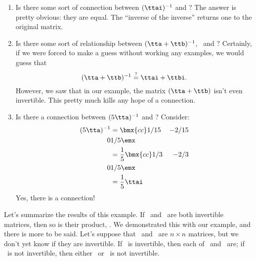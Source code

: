 {\begin{enumerate}
\item		Is there some sort of connection between $(\ttai)^{-1}$ and \tta? The answer is pretty obvious: they are equal. The ``inverse of the inverse'' returns one to the original matrix.


\item		Is there some sort of relationship between $(\tta+\ttb)^{-1}$, \ttai\ and \ttbi? Certainly, if we were forced to make a guess without working any examples, we would guess that 
\[
(\tta+\ttb)^{-1} \overset{\text{?}}{=} \ttai+\ttbi.
\]
However, we saw that in our example, the matrix $(\tta+\ttb)$ isn't even invertible. This pretty much kills any hope of a connection.

\item		Is there a connection between $(5\tta)^{-1}$ and \ttai? Consider:
	\begin{align*} 
   (5\tta)^{-1} &= \bmx{cc} 1/15 & -2/15\\ 0 & 1/5\emx \\
				&= \frac{1}{5} \bmx{cc} 1/3 & -2/3\\0&1/5\emx \\
				&= \frac 15 \ttai
	\end{align*}
\enlargethispage{2\baselineskip}	
	Yes, there is a connection!
\end{enumerate}
} 

\pagebreak

Let's summarize the results of this example. If \tta\ and \ttb\ are both invertible matrices, then so is their product, \tta\ttb. We demonstrated this with our example, and there is more to be said. Let's suppose that \tta\ and \ttb\ are $n\times n$ matrices, but we don't yet know if they are invertible. If \tta\ttb\ is invertible, then each of \tta\ and \ttb\ are; if \tta\ttb\ is not invertible, then either \tta\ or \ttb\ is not invertible.



